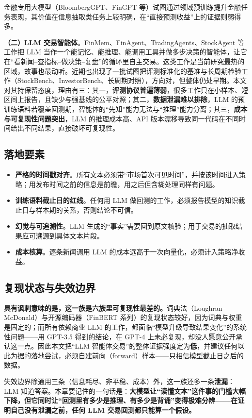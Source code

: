 金融专用大模型（BloombergGPT\cite{wu2023bloomberggpt}、FinGPT\cite{yang2023fingpt} 等）试图通过领域预训练提升金融任务表现，其价值在信息抽取类任务上较明确，在“直接预测收益”上的证据则弱得多。

\textbf{（二）LLM 交易智能体}。FinMem\cite{yu2023finmem}、FinAgent、TradingAgents、StockAgent 等工作把 LLM 当作一个能记忆、能推理、能调用工具并做多步决策的智能体，让它在“看新闻--查指标--做决策--复盘”的循环里自主交易。这类工作是当前研究最热的区域，故事也最动听。近期也出现了一批试图把评测标准化的基准与长周期检验工作（StockBench\cite{stockbench2025}、InvestorBench\cite{investorbench2024}、长周期对照\cite{llmlongrun2025}），方向对，但整体仍处早期。本文对其持保留态度，理由有三：其一，\textbf{评测协议普遍薄弱}，很多工作只在小样本、短区间上报告，且缺少与强基线的公平对照；其二，\textbf{数据泄漏难以排除}，LLM 的预训练语料若覆盖回测期，智能体的“先知”能力无法与“推理”能力分离；其三，\textbf{成本与可复现性问题突出}，LLM 的推理成本高、API 版本漂移导致同一代码在不同时间给出不同结果，直接破坏可复现性。

\subsection{落地要素}

\begin{itemize}
  \item \textbf{严格的时间戳对齐}。所有文本必须带“市场首次可见时间”，并按该时间进入策略；用发布时间之前的信息是前瞻，用之后但含糊处理同样有问题。
  \item \textbf{训练语料截止日的红线}。任何用 LLM 做回测的工作，必须报告模型的知识截止日与样本期的关系，否则结论不可信。
  \item \textbf{幻觉与可追溯性}。LLM 生成的“事实”需要回到原文核验；用于交易的抽取结果应可溯源到具体文本片段。
  \item \textbf{成本核算}。逐条新闻调用 LLM 的成本远高于一次向量化，必须计入策略净收益。
\end{itemize}

\subsection{复现状态与失效边界}

\textbf{具有讽刺意味的是，这一族是六族里可复现性最差的。}词典法（Loughran--McDonald）与开源编码器（FinBERT 系列）的复现状态较好，因为词典与权重是固定的；而所有依赖商业 LLM 的工作，都面临“模型升级导致结果变化”的系统性问题——用 GPT-3.5 得到的结论，在 GPT-4 上未必复现，却没人愿意公开承认这一点。因此本文把“LLM 智能体交易”的整体证据强度定为\textbf{低}，并建议任何以此为据的落地尝试，必须自建前向（forward）样本——只相信模型截止日之后的数据。

失效边界除通用三条（信息耗尽、非平稳、成本）外，这一族还多一条{\textbf{泄漏}：LLM 知道答案。}本章要记住的一句话是：\textbf{大模型让“读懂文本”这件事的门槛大幅下降，但它同时让“回测里有多少是推理、有多少是背诵”变得极难分辨——在证明自己没有泄漏之前，任何 LLM 交易回测都只能算一个假设。}

